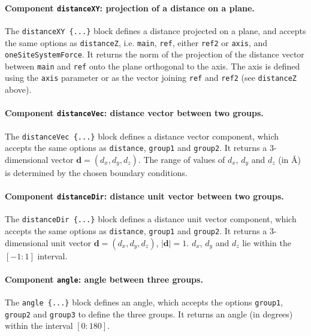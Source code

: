 \paragraph*{Component \texttt{distanceXY}: projection of a distance on a plane.}
The \texttt{distanceXY~\{...\}} block defines a distance projected
on a plane, and accepts the same options as \texttt{distanceZ}, i.e.
\texttt{main}, \texttt{ref}, either \texttt{ref2} or \texttt{axis}, and
\texttt{oneSiteSystemForce}.  It returns the
norm of the projection of the distance vector between \texttt{main} and
\texttt{ref} onto the plane orthogonal to the axis. The axis is
defined using the \texttt{axis} parameter or as the vector joining
\texttt{ref} and \texttt{ref2} (see \texttt{distanceZ} above).


\paragraph*{Component \texttt{distanceVec}: distance vector
  between two groups.}  The \texttt{distanceVec~\{...\}} block
defines a distance vector component, which accepts the same options as
\texttt{distance}, \texttt{group1} and \texttt{group2}.  It returns a
3-dimensional vector $\mathbf{d} = (d_{x}, d_{y}, d_{z})$. The
range of values of $d_{x}$, $d_{y}$ and $d_{z}$ (in \AA{})
is determined by the chosen boundary conditions.


\paragraph*{Component \texttt{distanceDir}: distance unit vector
  between two groups.}  The \texttt{distanceDir~\{...\}} block
defines a distance unit vector component, which accepts the same
options as \texttt{distance}, \texttt{group1} and \texttt{group2}.  It
returns a 3-dimensional unit vector $\mathbf{d} = (d_{x}, d_{y},
d_{z})$, $|\mathbf{d}| = 1$. $d_{x}$, $d_{y}$ and $d_{z}$ lie
within the $[-1:1]$ interval.


\paragraph*{Component \texttt{angle}: angle between three groups.}
The \texttt{angle~\{...\}} block defines an angle, which accepts the
options \texttt{group1}, \texttt{group2} and \texttt{group3} to define
the three groups.  It returns an angle (in degrees) within the
interval $[0:180]$.


